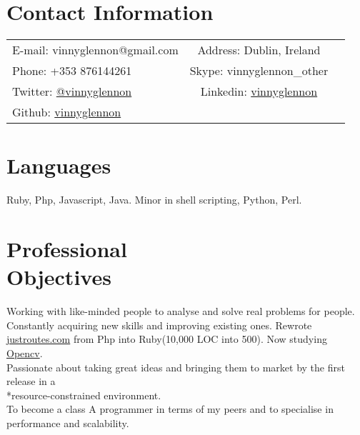 \documentclass[margin,line]{resume}
\begin{document}
\begin{resume}

    \section{\mysidestyle Contact Information}

    \begin{tabular}{ l c l}
    E-mail: vinnyglennon@gmail.com & Address: Dublin, Ireland\\
    Phone: +353 876144261 & Skype: vinnyglennon_other\\
    Twitter: \href{https://twitter.com/vinnyglennon}{@vinnyglennon} & Linkedin: \href{http://ie.linkedin.com/in/vinnyglennon}{vinnyglennon}\\
    Github: \href{https://github.com/vinnyglennon}{vinnyglennon} \\
    \end{tabular}

    \section{\mysidestyle Languages}
    Ruby, Php, Javascript, Java. Minor in shell scripting, Python, Perl.

    \section{\mysidestyle Professional \\ Objectives}
    Working with like-minded people to analyse and solve real problems for people.\vspace{1mm}\\%
    Constantly acquiring new skills and improving existing ones. Rewrote \href{http://justroutes.com}{justroutes.com} from Php into Ruby(10,000 LOC into 500). Now studying \href{http://opencv.willowgarage.com/wiki/}{Opencv}.\vspace{1mm}\\%
    Passionate about taking great ideas and bringing them to market by the first release in a \\*resource-constrained environment.\vspace{1mm}\\%
    To become a class A programmer in terms of my peers and to specialise in performance and scalability.


\end{resume}
\end{document}
